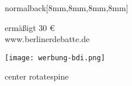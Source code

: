 \documentclass[
    coverwidth=160mm,
    coverheight=227mm,
    spinewidth=9mm,
    markcolor=black,
    marklength=8mm,
    trimmed=true,
    ]
    {bookcover}
\begin{document}
\begin{bookcover}
\begin{bookcoverelement}{normal}{back}[8mm,8mm,8mm,8mm]
{{\begin{minipage}[t]{72mm}
\begin{flushright}
{\begin{flushright}
                                    ermäßigt 30 € \\
                                    www.berlinerdebatte.de
                                \end{flushright}
                                }
                        \end{flushright}
                    \end{minipage} 
                    \begin{center}
                        \texttt{[image: werbung-bdi.png]}
                    \end{center}
                }
            }      
        \end{bookcoverelement}

        \begin{bookcoverelement}{center rotate}{spine}
            \bdispine \bdiTitle
            \hspace{9.5cm}
            \bdiReleaseTitle
        \end{bookcoverelement}
    \end{bookcover}
\end{document}
